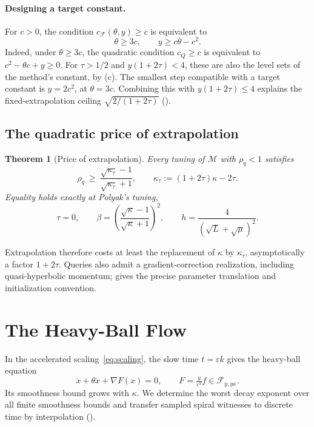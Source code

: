 \documentclass[11pt]{article}
\newtheorem{theorem}{Theorem}[section]
\theoremstyle{definition}
\theoremstyle{remark}
\newcommand{\cF}{\mathcal F}
\newcommand{\cM}{\mathcal M}
\newcommand{\cQ}{c_{Q}}
\newcommand{\cFF}{c_{\cF}}
\begin{document}
\paragraph{Designing a target constant.}
For \(c>0\), the condition \(\cFF(\theta,y)\ge c\) is equivalent to
\[
\theta\ge3c,\qquad y\ge c\theta-c^2.
\]
Indeed, under \(\theta\ge3c\), the quadratic condition \(\cQ\ge c\) is
equivalent to \(c^2-\theta c+y\ge0\).
For \(\tau>1/2\) and \(y(1+2\tau)<4\), these are also the level sets of
the method's constant, by (c).
The smallest step compatible with a target constant is \(y=2c^2\), at
\(\theta=3c\).  Combining this with \(y(1+2\tau)\le4\) explains the
fixed-extrapolation ceiling \(\sqrt{2/(1+2\tau)}\)
().

\subsection{The quadratic price of extrapolation}
\begin{theorem}[Price of extrapolation]\label{thm:price}
Every tuning of \(\cM\) with \(\rho_q<1\) satisfies
\[
\rho_q\ \ge\ \frac{\sqrt{\kappa_\tau}-1}{\sqrt{\kappa_\tau}+1},\qquad
\kappa_\tau:=(1+2\tau)\kappa-2\tau .
\]
Equality holds exactly at Polyak's tuning,
\[
\tau=0,\qquad
\beta=\left(\frac{\sqrt\kappa-1}{\sqrt\kappa+1}\right)^2,\qquad
h=\frac4{(\sqrt L+\sqrt\mu)^2}.
\]
\end{theorem}

Extrapolation therefore costs at least the replacement of \(\kappa\) by
\(\kappa_\tau\), asymptotically a factor \(1+2\tau\).
Queries also admit a gradient-correction realization, including
quasi-hyperbolic momentum;  gives the precise parameter
translation and initialization convention.

\section{The Heavy-Ball Flow}
\label{sec:flow}
%

In the accelerated scaling~\eqref{eq:scaling}, the slow time
\(t=\varepsilon k\) gives the heavy-ball equation
\[
\ddot x+\theta\dot x+\nabla F(x)=0,\qquad
F=\tfrac{y}{\varepsilon^2}f\in\cF_{y,y\kappa}.
\]
Its smoothness bound grows with \(\kappa\).  We determine the worst decay
exponent over all finite smoothness bounds and transfer sampled spiral
witnesses to discrete time by interpolation ().
\end{document}
